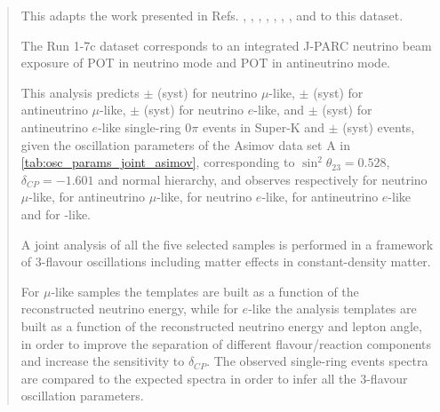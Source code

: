 \begin{frontmatter}
\begin{abstract}
This adapts the work presented in Refs. 
\cite{OurRun1DisappAnalysis},
\cite{OurRun12DisappAnalysis}, 
\cite{OurRun12DisappAnalysis3Flavour},
\cite{OurRun123DisappAnalysis3Flavour},
\cite{OurRun1234aDisappAnalysis3Flavour},
\cite{OurRun1234DisappAnalysis3Flavour},
\cite{OurRun123JointOscillationAnalysis},
\cite{OurRun1234JointOscillationAnalysis}
\cite{OurRun56AntiNumuDisappearanceAnalysis3Flavour} 
\cite{OurRun56AntiNueBarAppearanceAnalysis3Flavour}
and
\cite{OurRun1617b17cJointAnalysis3Flavour}
to this dataset.


The Run 1-7c dataset corresponds to an integrated J-PARC neutrino beam
exposure of \TotalPotNuRunOneSevenC{} POT in neutrino mode and
\TotalPotNuBarRunOneSevenC{} POT in antineutrino mode.

This analysis predicts 
\NskOscExpectationNumuRunOneSevenC{} $\pm$ \NskOscExpectationNumuErrorRunOneSevenC{} (syst) for neutrino $\mu$-like,
\NskOscExpectationNumuBarRunOneSevenC{} $\pm$ \NskOscExpectationNumuBarErrorRunOneSevenC{} (syst) for antineutrino $\mu$-like,
\NskOscExpectationNueRunOneSevenC{} $\pm$ \NskOscExpectationNueErrorRunOneSevenC{} (syst) for neutrino $e$-like,
and
\NskOscExpectationNueBarRunOneSevenC{} $\pm$ \NskOscExpectationNueBarErrorRunOneSevenC{} (syst) for antineutrino $e$-like
single-ring \( 0 \pi \) events in Super-K and \NskOscExpectationNueCConepiRunOneSevenC{} $\pm$ \NskOscExpectationNueCConepiErrorRunOneSevenC{} (syst) \nueCConepi{} events,
given the oscillation parameters of the Asimov data set A in \cref{tab:osc_params_joint_asimov},
corresponding to $\sin^2 \theta_{23} = 0.528$, $\delta_{CP} = -1.601$ and normal hierarchy, 
and observes respectively 
\NskObservedNumuRunOneSevenC{} for neutrino $\mu$-like,
\NskObservedNumuBarRunOneSevenC{}  for antineutrino $\mu$-like,
\NskObservedNueRunOneSevenC{}  for neutrino $e$-like,
\NskObservedNueBarRunOneSevenC{}  for antineutrino $e$-like and 
\NskObservedNueCConepiRunOneSevenC{} for \nueCConepi{}-like.

A joint analysis of all the five selected samples is performed 
in a framework of 3-flavour oscillations including matter effects in constant-density matter.

For $\mu$-like samples the templates are built as a function of the reconstructed neutrino energy,
while for $e$-like the analysis templates are built as a function of the reconstructed neutrino energy and lepton angle,
in order to improve the separation of different flavour/reaction components
and increase the sensitivity to $\delta_{CP}$.
The observed single-ring events spectra are compared to the expected spectra 
in order to infer all the 3-flavour oscillation parameters.


\end{abstract}
\end{frontmatter}
